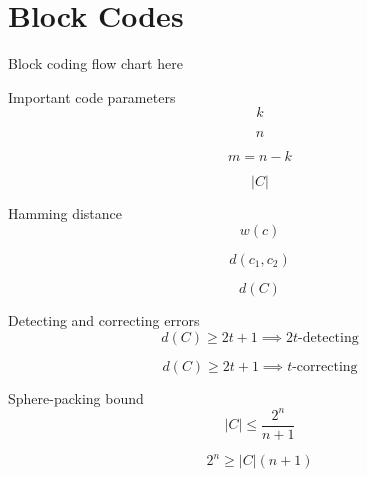 \section{Block Codes}

\begin{frame}{Block coding}
  flow chart here
\end{frame}
\begin{frame}{Important code parameters}
  \[
	k
  \]

  \[
	n
  \]

  \[
	m = n - k
  \]

  \[
	|C|
  \]
\end{frame}
\begin{frame}{Hamming distance}
  \[
	w(c)
  \]

  \[
	d(c_1, c_2)
  \]

  \[
	d(C)
  \]
\end{frame}
\begin{frame}{Detecting and correcting errors}
  \[
	d(C) \ge 2t + 1 \implies 2t\text{-detecting}
  \]

  \[
	d(C) \ge 2t + 1 \implies t\text{-correcting}
  \]
\end{frame}
\begin{frame}{Sphere-packing bound}
  \[
	|C| \le \frac{2^n}{n + 1}
  \]

  \[
	2^n \ge |C| (n + 1)
  \]
\end{frame}
